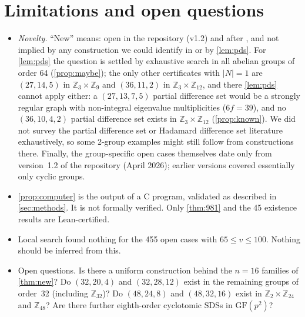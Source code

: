 \documentclass[11pt]{article}
\numberwithin{equation}{section}
\theoremstyle{definition}
\theoremstyle{remark}
\newcommand{\Z}{\mathbb Z}
\newcommand{\GF}{\mathrm{GF}}
\begin{document}
\section{Limitations and open questions}\label{sec:limits}

\begin{itemize}
\item \emph{Novelty.} ``New'' means: open in the repository (v1.2) and after \cite{HeWu2026},
and not implied by any construction we could identify in
\cite{Gordon2023,HeChenGe2024,HeWu2026} or by \cref{lem:pds}. For \cref{lem:pds} the question is
settled by exhaustive search in all abelian groups of order 64 (\cref{prop:maybe}); the only
other certificates with $|N|=1$ are $(27,14,5)$ in $\Z_3\times\Z_9$ and $(36,11,2)$ in
$\Z_3\times\Z_{12}$, and there \cref{lem:pds} cannot apply either: a $(27,13,7,5)$ partial
difference set would be a strongly regular graph with non-integral eigenvalue multiplicities
($6f=39$), and no $(36,10,4,2)$ partial difference set exists in $\Z_3\times\Z_{12}$
(\cref{prop:known}). We did not survey the partial difference set or Hadamard difference set
literature exhaustively, so some 2-group examples might still follow from constructions there.
Finally, the group-specific open cases themselves date only from version~1.2 of the repository
(April 2026); earlier versions covered essentially only cyclic groups.
\item \cref{prop:computer} is the output of a C program, validated as described in
\cref{sec:methods}. It is not formally verified. Only \cref{thm:981} and the 45 existence
results are Lean-certified.
\item Local search found nothing for the 455 open cases with $65\le v\le100$. Nothing should be
inferred from this.
\item Open questions. Is there a uniform construction behind the $n=16$ families of
\cref{thm:new}? Do $(32,20,4)$ and $(32,28,12)$ exist in the remaining groups of order~32
(including $\Z_{32}$)? Do $(48,24,8)$ and $(48,32,16)$ exist in $\Z_2\times\Z_{24}$ and $\Z_{48}$?
Are there further eighth-order cyclotomic SDSs in $\GF(p^2)$?
\end{itemize}
\end{document}
